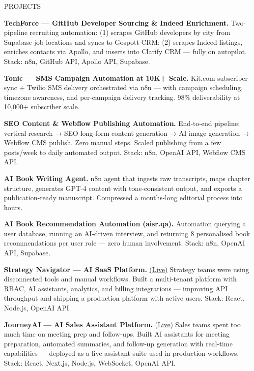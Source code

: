 \documentclass{resume}
\begin{document}
\begin{rSection}{PROJECTS}
\item \textbf{TechForce — GitHub Developer Sourcing \& Indeed Enrichment.} {Two-pipeline recruiting automation: (1) scrapes GitHub developers by city from Supabase job locations and syncs to Gospott CRM; (2) scrapes Indeed listings, enriches contacts via Apollo, and inserts into Clarify CRM — fully on autopilot. Stack: n8n, GitHub API, Apollo API, Supabase.}

\item \textbf{Tonic — SMS Campaign Automation at 10K+ Scale.} {Kit.com subscriber sync + Twilio SMS delivery orchestrated via n8n — with campaign scheduling, timezone awareness, and per-campaign delivery tracking. 98\% deliverability at 10,000+ subscriber scale.}

\item \textbf{SEO Content \& Webflow Publishing Automation.} {End-to-end pipeline: vertical research → SEO long-form content generation → AI image generation → Webflow CMS publish. Zero manual steps. Scaled publishing from a few posts/week to daily automated output. Stack: n8n, OpenAI API, Webflow CMS API.}

\item \textbf{AI Book Writing Agent.} {n8n agent that ingests raw transcripts, maps chapter structure, generates GPT-4 content with tone-consistent output, and exports a publication-ready manuscript. Compressed a months-long editorial process into hours.}

\item \textbf{AI Book Recommendation Automation (aisr.qa).} {Automation querying a user database, running an AI-driven interview, and returning 8 personalised book recommendations per user role — zero human involvement. Stack: n8n, OpenAI API, Supabase.}

\item \textbf{Strategy Navigator — AI SaaS Platform.} \href{https://strategynavigator.ai/}{(Live)} {Strategy teams were using disconnected tools and manual workflows. Built a multi-tenant platform with RBAC, AI assistants, analytics, and billing integrations — improving API throughput and shipping a production platform with active users. Stack: React, Node.js, OpenAI API.}

\item \textbf{JourneyAI — AI Sales Assistant Platform.} \href{https://meetjourney.ai/}{(Live)} {Sales teams spent too much time on meeting prep and follow-ups. Built AI assistants for meeting preparation, automated summaries, and follow-up generation with real-time capabilities — deployed as a live assistant suite used in production workflows. Stack: React, Next.js, Node.js, WebSocket, OpenAI API.}


\end{rSection}
\end{document}
